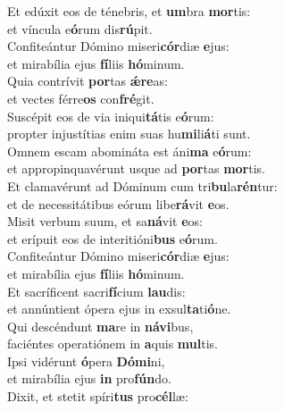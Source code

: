 \evenverse Et edúxit eos de ténebris, et \textbf{um}bra \textbf{mor}tis:~\*\\
\evenverse et víncula e\textbf{ó}rum dis\textbf{rú}pit.\\
\oddverse Confiteántur Dómino miseri\textbf{cór}diæ \textbf{e}jus:~\*\\
\oddverse et mirabília ejus \textbf{fí}liis \textbf{hó}minum.\\
\evenverse Quia contrívit \textbf{por}tas \textbf{ǽ}\textbf{re}as:~\*\\
\evenverse et vectes férre\textbf{os} con\textbf{fré}git.\\
\oddverse Suscépit eos de via iniqui\textbf{tá}tis e\textbf{ó}rum:~\*\\
\oddverse propter injustítias enim suas hu\textbf{mi}li\textbf{á}ti sunt.\\
\evenverse Omnem escam abomináta est áni\textbf{ma} e\textbf{ó}rum:~\*\\
\evenverse et appropinquavérunt usque ad \textbf{por}tas \textbf{mor}tis.\\
\oddverse Et clamavérunt ad Dóminum cum tri\textbf{bu}la\textbf{rén}tur:~\*\\
\oddverse et de necessitátibus eórum libe\textbf{rá}vit \textbf{e}os.\\
\evenverse Misit verbum suum, et sa\textbf{ná}vit \textbf{e}os:~\*\\
\evenverse et erípuit eos de interitióni\textbf{bus} e\textbf{ó}rum.\\
\oddverse Confiteántur Dómino miseri\textbf{cór}diæ \textbf{e}jus:~\*\\
\oddverse et mirabília ejus \textbf{fí}liis \textbf{hó}minum.\\
\evenverse Et sacríficent sacri\textbf{fí}cium \textbf{lau}dis:~\*\\
\evenverse et annúntient ópera ejus in exsul\textbf{ta}ti\textbf{ó}ne.\\
\oddverse Qui descéndunt \textbf{ma}re in \textbf{ná}\textbf{vi}bus,~\*\\
\oddverse faciéntes operatiónem in \textbf{a}quis \textbf{mul}tis.\\
\evenverse Ipsi vidérunt \textbf{ó}pera \textbf{Dó}\textbf{mi}ni,~\*\\
\evenverse et mirabília ejus \textbf{in} pro\textbf{fún}do.\\
\oddverse Dixit, et stetit spíri\textbf{tus} pro\textbf{cél}læ:~\*\\
